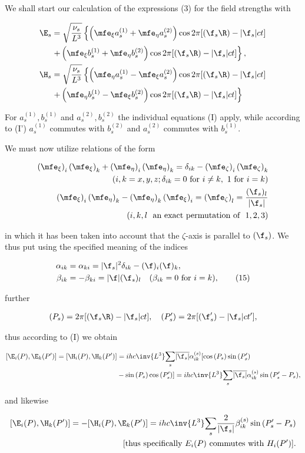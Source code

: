 \documentclass{article}
\newcommand{\nequ}[2]{
\begin{align*}
#1
\tag{#2}
\end{align*}
}
\newcommand{\uequ}[1]{
\begin{align*}
#1
\end{align*}
}
\newcommand{\sumX}[1]{\underset{#1}{\sum}}
\begin{document}
We shall start our calculation of the expressions (3) for the field strengths with
\uequ{
\E_s &= \sqrt{\frac{\nu_s}{L^3}}\left\{\left(\mfe_\xi a_s^{(1)} + \mfe_\eta a_s^{(2)}\right)
\cos{2\pi[(\f_s\R) - |\f_s|ct]}\right.\\
&\left. + \left(\mfe_\xi b_s^{(1)} + \mfe_\eta b_s^{(2)}\right)
\cos{2\pi[(\f_s\R) - |\f_s|ct]}\right\},\\
\H_s &= \sqrt{\frac{\nu_s}{L^3}}\left\{\left(\mfe_\eta a_s^{(1)} - \mfe_\xi a_s^{(2)}\right)
\cos{2\pi[(\f_s\R) - |\f_s|ct]}\right.\\
&\left. + \left(\mfe_\eta b_s^{(1)} - \mfe_\xi b_s^{(2)}\right)
\cos{2\pi[(\f_s\R) - |\f_s|ct]}\right\}
}
For $a_s^{(1)},b_s^{(1)}$ and $a_s^{(2)},b_s^{(2)}$ the individual equations (I) apply, while according to (I') $a_s^{(1)}$ commutes with $b_s^{(2)}$ and $a_s^{(2)}$ commutes with $b_s^{(1)}$.

We must now utilize relations of the form
\uequ{
\left(\mfe_\xi\right)_i \left(\mfe_\xi\right)_k + \left(\mfe_\eta\right)_i \left(\mfe_\eta\right)_k =
\delta_{ik} - \left(\mfe_\zeta\right)_i \left(\mfe_\zeta\right)_k\\
(i,k=x,y,z; \delta_{ik} = 0 \text{ for } i\neq k,\,\, 1\text{ for } i=k)\\
\left(\mfe_\xi\right)_i \left(\mfe_\eta\right)_k - \left(\mfe_\eta\right)_k \left(\mfe_\xi\right)_i =
\left(\mfe_\zeta\right)_l = \frac{(\f_s)_l}{|\f_s|}\\
(i,k,l \,\,\text{ an exact permutation of }\,\, 1,2,3)
}
in which it has been taken into account that the $\zeta$-axis is parallel to $(\f_s)$. We thus put using the specified meaning of the indices
\nequ{
\alpha_{ik} &= \alpha_{ki} = |\f_s|^2 \delta_{ik} - (\f)_i (\f)_k,\\
\beta_{ik}  &= -\beta_{ki} = |\f|(\f_s)_l \quad (\beta_{ik} = 0 \text{ for } i=k),
}{15}
further
\uequ{
(P_s) = 2\pi[(\f_s\R) - |\f_s|ct],\quad (P'_s) = 2\pi [(\f'_s) - |\f_s|ct'],
}
thus according to (I) we obtain
\uequ{
[\E_i(P),\E_k(P')] = [\H_i(P), \H_k(P')] 
&= ihc \inv{L^3}\sumX{s}\overline{|\f_s|}\alpha_{ik}^{(s)}[\cos{(P_s)}\sin{(P'_s)}\\
&- \sin{(P_s)}\cos{(P'_s)}] = ihc\inv{L^3}\sumX{s}\overline{|\f_s|}\alpha_{ik}^{(s)}\sin{(P'_s-P_s)},
}
and likewise
\uequ{
[\E_i(P),\H_k(P')] = -[\H_i(P), \E_k(P')] 
= ihc\inv{L^3}\sumX{s}\frac{2}{|\f_s|}\beta_{ik}^{(s)}\sin{(P'_s - P_s)}\\
\text{[thus specifically $E_i(P)$ commutes with $H_i(P')$]}.
}
\end{document}
